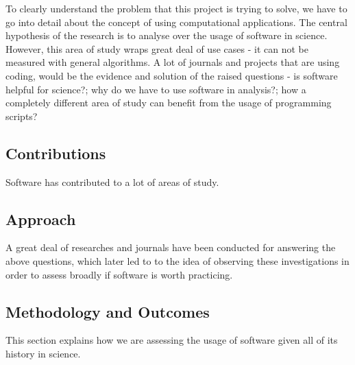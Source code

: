 
To clearly understand the problem that this project is trying to solve, we have to go into detail about the concept of using computational applications. The central hypothesis of the research is to analyse over the usage of software in science. However, this area of study wraps great deal of use cases - it can not be measured with general algorithms. A lot of journals and projects that are using coding, would be the evidence and solution of the raised questions - is software helpful for science?; why do we have to use software in analysis?; how a completely different area of study can benefit from the usage of programming scripts? 

\subsection*{Contributions}

Software has contributed to a lot of areas of study.

\subsection*{Approach}

A great deal of researches and journals have been conducted for answering the above questions, which later led to to the idea of observing these investigations in order to assess broadly if software is worth practicing. 

\subsection*{Methodology and Outcomes}

This section explains how we are assessing the usage of software given all of its history in science.

 \cite{chasmSoftware}
